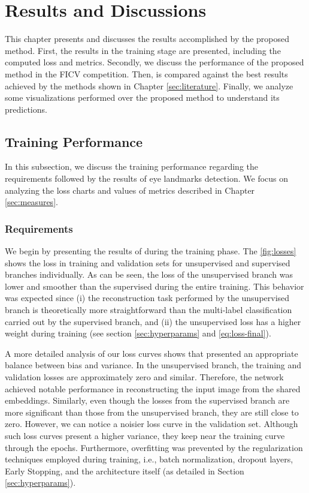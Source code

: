 \section{Results and Discussions} \label{sec:results}
 
This chapter presents and discusses the results accomplished by the proposed method. First, the \methodname results in the training stage are presented, including the computed loss and metrics. Secondly, we discuss the performance of the proposed method in the FICV competition. Then, \methodname is compared against the best results achieved by the methods shown in Chapter \ref{sec:literature}. Finally, we analyze some visualizations performed over the proposed method to understand its predictions.
 
\subsection{Training Performance}
 
In this subsection, we discuss the training performance regarding the \icao requirements followed by the results of eye landmarks detection. We focus on analyzing the loss charts and values of metrics described in Chapter \ref{sec:measures}.
 
\subsubsection{Requirements}
 
We begin by presenting the results of \methodname during the training phase. The \autoref{fig:losses} shows the loss in training and validation sets for unsupervised and supervised branches individually. As can be seen, the loss of the unsupervised branch was lower and smoother than the supervised during the entire training. This behavior was expected since (i) the reconstruction task performed by the unsupervised branch is theoretically more straightforward than the multi-label classification carried out by the supervised branch, and (ii) the unsupervised loss has a higher weight during training (see section \ref{sec:hyperparams} and \autoref{eq:loss-final}). 
 
A more detailed analysis of our loss curves shows that \methodname presented an appropriate balance between bias and variance. In the unsupervised branch, the training and validation losses are approximately zero and similar. Therefore, the network achieved notable performance in reconstructing the input image from the shared embeddings. Similarly, even though the losses from the supervised branch are more significant than those from the unsupervised branch, they are still close to zero. However, we can notice a noisier loss curve in the validation set. Although such loss curves present a higher variance, they keep near the training curve through the epochs. Furthermore, overfitting was prevented by the regularization techniques employed during training, i.e., batch normalization, dropout layers, Early Stopping, and the architecture itself (as detailed in Section \ref{sec:hyperparams}).
 
